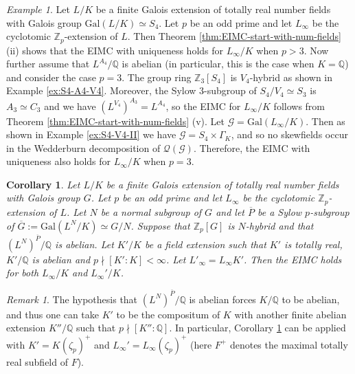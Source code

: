 \documentclass[12pt]{amsart}
\theoremstyle{plain}
\newtheorem{corollary}[theorem]{Corollary}
\theoremstyle{remark}
\newtheorem{remark}[theorem]{Remark}
\newtheorem{example}[theorem]{Example}
\theoremstyle{definition}
\numberwithin{equation}{section}
\begin{document}
\begin{example}\label{ex:EIMC-S4}
Let $L/K$ be a finite Galois extension of totally real number fields with Galois group ${\mathrm{Gal}}(L/K) \simeq S_{4}$.
Let $p$ be an odd prime and let $L_{\infty}$ be the cyclotomic ${\mathbb{Z}}_{p}$-extension of $L$.
Then Theorem \ref{thm:EIMC-start-with-num-fields} (ii) shows that  the EIMC with uniqueness holds for $L_{\infty}/K$ when $p>3$.
Now further assume that $L^{A_{4}}/{\mathbb{Q}}$ is abelian (in particular, this is the case when $K={\mathbb{Q}}$) and consider the case $p=3$.
The group ring ${\mathbb{Z}}_{3}[S_{4}]$ is $V_{4}$-hybrid as shown in Example \ref{ex:S4-A4-V4}.
Moreover, the Sylow $3$-subgroup of $S_{4}/V_{4} \simeq S_{3}$ is $A_{3} \simeq C_{3}$ and we have
$(L^{V_{4}})^{A_{3}}=L^{A_{4}}$, so the EIMC for $L_{\infty}/K$ follows from Theorem \ref{thm:EIMC-start-with-num-fields} (v).
Let $\mathcal{G}={\mathrm{Gal}}(L_{\infty}/K)$.
Then as shown in Example \ref{ex:S4-V4-II} we have $\mathcal{G} = S_{4} \times \Gamma_{K}$,
and so no skewfields occur in the Wedderburn decomposition of $\mathcal{Q}(\mathcal{G})$.
Therefore, the EIMC with uniqueness also holds for $L_{\infty}/K$ when $p=3$.
\end{example}

\begin{corollary}\label{cor:pth-root-base-change}
Let $L/K$ be a finite Galois extension of totally real number fields with Galois group $G$.
Let $p$ be an odd prime and let $L_{\infty}$ be the cyclotomic ${\mathbb{Z}}_{p}$-extension of $L$.
Let $N$ be a normal subgroup of $G$ and let $\overline{P}$ be a Sylow $p$-subgroup of $\overline{G}:={\mathrm{Gal}}(L^{N}/K) \simeq G/N$.
Suppose that ${\mathbb{Z}}_{p}[G]$ is $N$-hybrid and that $(L^{N})^{\overline{P}}/{\mathbb{Q}}$ is abelian.
Let $K'/K$ be a field extension such that $K'$ is totally real, $K'/{\mathbb{Q}}$ is abelian and $p \nmid [K':K] < \infty$.
Let $L'_{\infty}=L_{\infty}K'$.
Then the EIMC holds for both $L_{\infty}/K$ and $L_{\infty}'/K$.
\end{corollary}

\begin{remark}\label{rmk:base-change-in-particular}
The hypothesis that $(L^{N})^{\overline{P}}/{\mathbb{Q}}$ is abelian forces $K/{\mathbb{Q}}$ to be abelian, and thus one can
take $K'$ to be the compositum of $K$ with another finite abelian extension $K''/{\mathbb{Q}}$ such that $p \nmid [K'':{\mathbb{Q}}]$.
In particular, Corollary \ref{cor:pth-root-base-change} can be applied with $K'=K(\zeta_{p})^{+}$
and $L_{\infty}'=L_{\infty}(\zeta_{p})^{+}$ (here $F^{+}$ denotes the maximal totally real subfield of $F$).
\end{remark}
\end{document}
